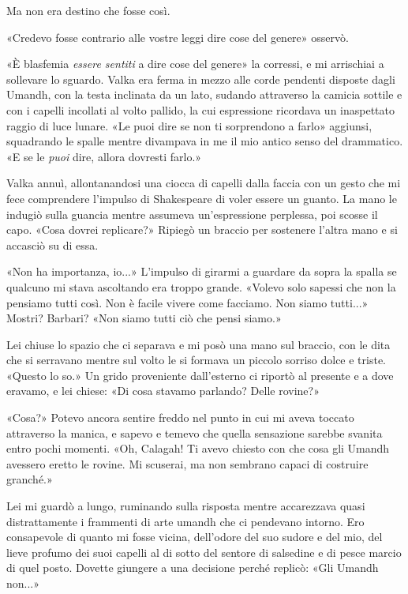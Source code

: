 Ma non era destino che fosse così.

«Credevo fosse contrario alle vostre leggi dire cose del genere»
osservò.

«È blasfemia \emph{essere sentiti} a dire cose del genere» la corressi,
e mi arrischiai a sollevare lo sguardo. Valka era ferma in mezzo alle
corde pendenti disposte dagli Umandh, con la testa inclinata da un lato,
sudando attraverso la camicia sottile e con i capelli incollati al volto
pallido, la cui espressione ricordava un inaspettato raggio di luce
lunare. «Le puoi dire se non ti sorprendono a farlo» aggiunsi,
squadrando le spalle mentre divampava in me il mio antico senso del
drammatico. «E se le \emph{puoi} dire, allora dovresti farlo.»

Valka annuì, allontanandosi una ciocca di capelli dalla faccia con un
gesto che mi fece comprendere l'impulso di Shakespeare di voler essere
un guanto. La mano le indugiò sulla guancia mentre assumeva
un'espressione perplessa, poi scosse il capo. «Cosa dovrei replicare?»
Ripiegò un braccio per sostenere l'altra mano e si accasciò su di essa.

«Non ha importanza, io...» L'impulso di girarmi a guardare da sopra la
spalla se qualcuno mi stava ascoltando era troppo grande. «Volevo solo
sapessi che non la pensiamo tutti così. Non è facile vivere come
facciamo. Non siamo tutti...» Mostri? Barbari? «Non siamo tutti ciò che
pensi siamo.»

Lei chiuse lo spazio che ci separava e mi posò una mano sul braccio, con
le dita che si serravano mentre sul volto le si formava un piccolo
sorriso dolce e triste. «Questo lo so.» Un grido proveniente
dall'esterno ci riportò al presente e a dove eravamo, e lei chiese: «Di
cosa stavamo parlando? Delle rovine?»

«Cosa?» Potevo ancora sentire freddo nel punto in cui mi aveva toccato
attraverso la manica, e sapevo e temevo che quella sensazione sarebbe
svanita entro pochi momenti. «Oh, Calagah! Ti {avevo} chiesto con che
cosa gli Umandh avessero eretto le rovine. Mi scuserai, ma non sembrano
capaci di costruire granché.»

Lei mi guardò a lungo, ruminando sulla risposta mentre accarezzava quasi
distrattamente i frammenti di arte umandh che ci pendevano intorno. Ero
consapevole di quanto mi fosse vicina, dell'odore del suo sudore e del
mio, del lieve profumo dei suoi capelli al di sotto del sentore di
salsedine e di pesce marcio di quel posto. Dovette giungere a una
decisione perché replicò: «Gli Umandh non...»

